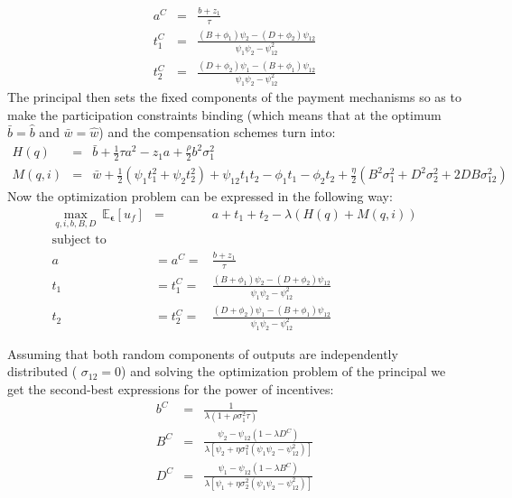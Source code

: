 \documentclass[12pt,letterpaper]{article}
\begin{document}
\begin{eqnarray}
a^{C}&=&\frac{b+z_1}{\tau}\label{aso}\\
t_1^{C}&=&\frac{(B+\phi_1)\psi_2-(D+\phi_2)\psi_{12}}{\psi_1\psi_2-\psi_{12}^2}\label{t1so}\\
t_{{2}}^{C}&=&\frac { \left( D+\phi_{{2}} \right) \psi_{{1}}- \left( B+\phi _{{1}} \right)
\psi_{{12}}}{\psi_1\psi_2-\psi_{12}^2}\label{t2so}
\end{eqnarray}
The principal then sets the fixed components of the payment mechanisms so as to make the participation constraints binding (which means that at the optimum  $ \bar{b}=\widehat{b} $ and $\bar{w}=\widehat{w} $) and the compensation schemes turn into:
\begin{eqnarray*}
 H(q) &=& \bar{b}+\frac{1}{2}\tau a^2-z_1a+\frac{\rho}{2}b^2\sigma_1^2\\
  M(q,i) &=& \bar{w}+\frac{1}{2}(\psi_1t_1^2+
\psi_2t_2^2)+\psi_{12}t_1t_2-\phi_1t_1-\phi_2t_2+\frac{\eta}{2}(B^2\sigma_1^2+D^2
\sigma_2^2+2DB\sigma_{12}^2)
\end{eqnarray*}
Now the optimization problem can be expressed in the following way:
\begin{eqnarray*}
\max\limits_{q,i,b,B,D}\ \mathbb{E}_{\mathbold{\epsilon}}[u_f]&=&a+t_1+t_2-\lambda(H(q)+M(q,i))\\
\nonumber \text{subject to }&&\\
a&=a^{C}=&\frac{b+z_1}{\tau}\\
t_1&=t_1^{C}=&\frac{(B+\phi_1)\psi_2-(D+\phi_2)\psi_{12}}{\psi_1\psi_2-\psi_{12}^2}\\
t_2&=t_2^{C}=&\frac { \left( D+\phi_{{2}} \right) \psi_{{1}}- \left( B+\phi _{{1}} \right)
\psi_{{12}}}{\psi_1\psi_2-\psi_{12}^2}
\end{eqnarray*}

Assuming that both random components of outputs are independently distributed ( $\sigma_{12}=0$) and solving the optimization problem of the principal we get the second-best expressions for the power of incentives:
\begin{eqnarray}
b^C&=&\frac {1}{\lambda(1+\rho\sigma_1^2\tau)}\label{bso}\\
B^C&=&\frac{\psi_2-\psi_{12}(1-\lambda D^C)}{\lambda[\psi_2+\eta\sigma_1^2(\psi_1\psi_2-
\psi_{12}^2)]}\label{Bso1}\\
D^C&=&\frac{\psi_1-\psi_{12}(1-\lambda
B^C)}{\lambda[\psi_1+\eta\sigma_2^2(\psi_1\psi_2-\psi_{12}^2)]}\label{Dso1}
\end{eqnarray}
\end{document}
